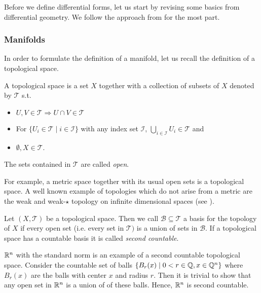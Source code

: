 \documentclass[../master_thesis.tex]{subfiles}
\begin{document}
Before we define differential forms, let us start by revising some basics
from differential geometry. We follow the approach from 
\cite[Sec. II]{topology_and_geometry} for the most part. 

\subsubsection{Manifolds}

In order to formulate the definition of a manifold, let us recall the 
definition of a topological space.
\begin{definition}
    A topological space is a set $X$ together with a collection of subsets of 
    $X$ denoted by $\mathcal{T}$ s.t.
    \begin{itemize}
        \item $U,V \in \mathcal{T} \Rightarrow U \cap V \in \mathcal{T}$
        \item For $\{ U_i \in \mathcal{T} \mid i \in \mathcal{I} \}$
            with any index set $\mathcal{I}$, 
            $\bigcup_{i\in \mathcal{I}} U_i \in \mathcal{T}$ and
        \item $\emptyset, X \in \mathcal{T}$.
    \end{itemize}
    The sets contained in $\mathcal{T}$ are called \textit{open}.
\end{definition}
For example, a metric space together with its usual open sets is a topological
space. A well known example of topologies which do not arise from a metric
are the weak and weak-$\star$ topology on infinite dimensional spaces
(see \cite[Ch.\,3]{brezis}).

\begin{definition}
    Let $(X,\mathcal{T})$ be a topological space. Then we call 
    $\mathcal{B}\subseteq \mathcal{T}$ a basis for the topology of $X$ if 
    every open set (i.e. every set in $\mathcal{T})$ is a union of sets 
    in $\mathcal{B}$. If a topological space has a countable basis it is called
    \textit{second countable}.
\end{definition}
$\mathbb{R}^n$ with the standard norm is an example of a second countable topological space. Consider 
the countable set of balls $\{ B_r(x) \mid 0 < r \in \mathbb{Q}, x \in \mathbb{Q}^n\}$
where $ B_r(x)$ are the balls with center $x$ and radius $r$.
Then it is trivial to show that any open set in $\mathbb{R}^n$ is a union of 
of these balls. Hence, $\mathbb{R}^n$ is second countable.
\end{document}
